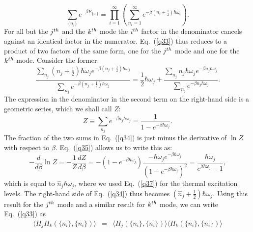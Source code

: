 \documentclass[12pt]{elsart}
\begin{document}
{\begin{equation}
\sum_{ \{ n_{i} \}  } e^{ \displaystyle{ -\beta E_{ \{ n_{i} \} } } } 
= \prod_{i=1}^\infty \left( \sum_{n_i = 1}^\infty 
e^{ \displaystyle{ -\beta  \left(n_{i}+\frac{1}{2}\right)\hbar\omega_{i} } } \right).
\label{q33a}
\end{equation}
For all but the $j^{\rm th}$ and the $k^{\rm th}$ mode the $i^{\rm th}$  factor in the denominator cancels against an identical factor in the numerator. Eq.\ (\ref{q33}) thus reduces to a product of two factors of the same form, one for the $j^{\rm th}$ mode and one for the $k^{\rm th}$ mode. Consider the former:
\begin{equation}
\frac{ \displaystyle{ \sum_{n_{j}} }
\left(n_{j}+ \displaystyle{ \frac{1}{2}} \right)\hbar\omega_{j}
e^{-\beta(n_{j}+\frac{1}{2})\hbar\omega_{j}}}{\displaystyle {\sum_{n_{j}}}e^{-\beta (n_{j}+\frac{1}{2}) \hbar\omega_{j}}} = \frac{1}{2} \hbar \omega_j + 
\frac{ \displaystyle{ \sum_{n_{j}} }
n_{j} \hbar\omega_{j}
e^{-\beta n_{j}\hbar\omega_{j}}}{\displaystyle{\sum_{n_{j}}}e^{-\beta n_{j} \hbar\omega_{j}}}.
\label{q34}
\end{equation}
The expression in the denominator in the second term on the right-hand side is a geometric series, which we shall call $Z$:
\begin{equation}
Z \equiv  \displaystyle{\sum_{n_{j}}}e^{-\beta n_{j} \hbar\omega_{j}} = \frac{1}{1 - e^{-\beta \hbar\omega_j }}.
\label{q35}
\end{equation}
The fraction of the two sums in Eq.\ (\ref{q34}) is just minus the derivative of $\ln Z$ with respect to $\beta$. Eq.\ (\ref{q35}) allows us to write this as:
\begin{equation}
- \frac{d}{d\beta} \ln Z = - \frac{1}{Z} \frac{dZ}{d\beta} = 
- \left( 1 - e^{-\beta \hbar\omega_j} \right) \frac{- \hbar \omega_j e^{-\beta \hbar\omega_j} }{
\left( 1 - e^{-\beta \hbar\omega_j} \right)^2 } = \frac{ \hbar \omega_j}{ e^{\beta \hbar\omega_j} -1},
\label{q36}
\end{equation}
which is equal to $\hat{n}_j \hbar \omega_j$, where we used Eq.\ (\ref{q37}) for the thermal excitation levels. The right-hand side of Eq.\ (\ref{q34}) thus becomes $\left( \hat{n}_j + \frac{1}{2} \right) \hbar \omega_j$. Using this result for the $j^{\rm th}$ mode and a similar result for $k^{\rm th}$ mode, we can write Eq.\ (\ref{q33}) as
\begin{eqnarray}
\langle H_j H_k (\{ n_i \}, \{ n_i \}) \rangle & = & \langle H_j (\{ n_i \}, \{ n_i \}) \rangle
\langle H_k (\{ n_i \}, \{ n_i \}) \rangle
\nonumber \\

\end{eqnarray}}
\end{document}
